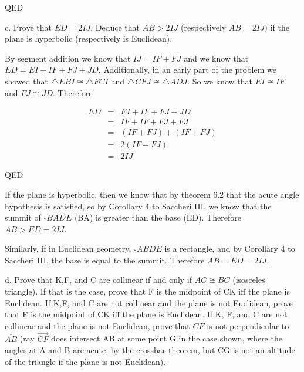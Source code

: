 \documentclass[12pt,letterpaper]{article}
\newcommand{\Proof}{\noindent {\bf Proof: }}
\newcommand{\QED}{\begin{flushright}QED\end{flushright}}
\begin{document}
\QED







\newpage 

c. Prove that $\overline{ED} = 2\overline{IJ}$.  Deduce that $\overline{AB} > 2\overline{IJ}$ (respectively $\overline{AB} = 2\overline{IJ}$) if the plane is hyperbolic (respectively is Euclidean).\\

\Proof


By segment addition we know that $IJ = IF + FJ$ and we know that $ED = EI + IF + FJ + JD$.  Additionally, in an early part of the problem we showed that $\triangle EBI \cong \triangle FCI$ and $\triangle CFJ \cong \triangle ADJ$.  So we know that $EI \cong IF$ and $FJ \cong JD$.  Therefore 

\begin{eqnarray*}
ED &=& EI + IF + FJ + JD\\
&=& IF + IF + FJ + FJ\\
&=& (IF + FJ) + (IF + FJ)\\
&=& 2(IF + FJ)\\
&=& 2IJ
\end{eqnarray*}

\QED


If the plane is hyperbolic, then we know that by theorem 6.2 that the acute angle hypothesis is satisfied, so by Corollary 4 to Saccheri III, we know that the summit of $\square BADE$ (BA) is greater than the base (ED).  Therefore $AB > ED = 2IJ$.  

Similarly, if in Euclidean geometry, $\square ABDE$ is a rectangle, and by Corollary 4 to Saccheri III, the base is equal to the summit.  Therefore $AB = ED = 2IJ$.  






\newpage 

d. Prove that K,F, and C are collinear if and only if $AC \cong BC$ (isosceles triangle).  If that is the case, prove that F is the midpoint of CK iff the plane is Euclidean.  If K,F, and C are not collinear and the plane is not Euclidean, prove that F is the midpoint of CK iff the plane is Euclidean.  If K, F, and C are not collinear and the plane is not Euclidean, prove that $\overline{CF}$ is not perpendicular to $\overline{AB}$ (ray $\overrightarrow{CF}$ does intersect AB at some point G in the case shown, where the angles at A and B are acute, by the crossbar theorem, but CG is not an altitude of the triangle if the plane is not Euclidean).\\
\end{document}
